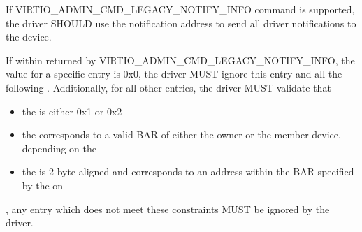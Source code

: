 If VIRTIO_ADMIN_CMD_LEGACY_NOTIFY_INFO command is supported, the driver
SHOULD use the notification address to send all driver notifications to the
device.

If within  returned by
VIRTIO_ADMIN_CMD_LEGACY_NOTIFY_INFO, the  value
for a specific  entry is 0x0, the
driver MUST ignore this entry and all the following .
Additionally, for all other entries, the driver MUST validate that
\begin{itemize}
\item the  is either 0x1 or 0x2
\item the  corresponds to a valid BAR of either the owner or the
member device, depending on the 
\item the  is 2-byte aligned and corresponds to an address
within the BAR specified by the 
on 
\end{itemize}, any entry which does not meet these constraints MUST be ignored
by the driver.
